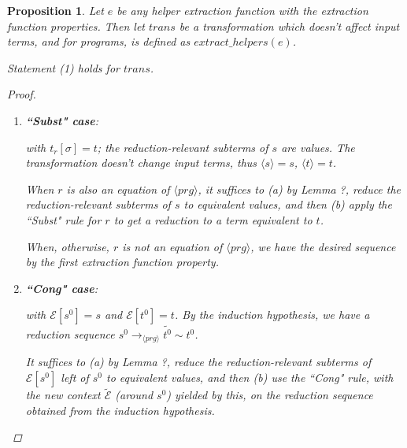 \documentclass[11pt]{article} %
\newtheorem{proposition}{Proposition}
\begin{document}
\begin{proposition}

Let $e$ be any helper extraction function with the extraction function properties. Then let $trans$ be a transformation which doesn't affect input terms, and for programs, is defined as $extract\_helpers(e)$.

Statement (1) holds for $trans$.

\begin{proof}

\begin{enumerate}
\item \textbf{``Subst" case}:

\begin{prooftree}
\end{prooftree}

with $t_r[\sigma] = t$; the reduction-relevant subterms of $s$ are values. The transformation doesn't change input terms, thus $\langle s \rangle = s$, $\langle t \rangle = t$.

When $r$ is also an equation of $\langle prg \rangle$, it suffices to (a) by Lemma ?, reduce the reduction-relevant subterms of $s$ to equivalent values, and then (b) apply the ``Subst" rule for $r$ to get a reduction to a term equivalent to $t$.

When, otherwise, $r$ is not an equation of $\langle prg \rangle$, we have the desired sequence by the first extraction function property.

\item \textbf{``Cong" case}:

\begin{prooftree}
\end{prooftree}

with $\mathcal{E}[s^0] = s$ and $\mathcal{E}[t^0] = t$. By the induction hypothesis, we have a reduction sequence $s^0 \longrightarrow_{\langle prg \rangle} \widetilde{t^0} \sim t^0$.

It suffices to (a) by Lemma ?, reduce the reduction-relevant subterms of $\mathcal{E}[s^0]$ left of $s^0$ to equivalent values, and then (b) use the ``Cong" rule, with the new context $\widetilde{\mathcal{E}}$ (around $s^0$) yielded by this, on the reduction sequence obtained from the induction hypothesis.

\end{enumerate}

\end{proof}

\end{proposition}
\end{document}
